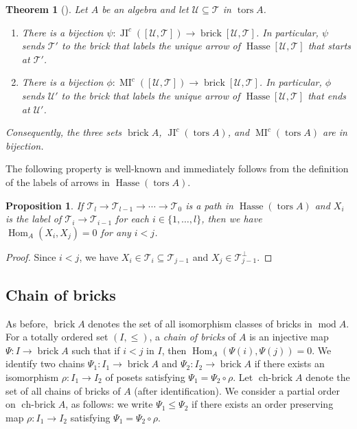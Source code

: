 \documentclass{amsart}
\theoremstyle{thmstyle}
\newtheorem{theorem}[thm]{Theorem}
\newtheorem{proposition}[thm]{Proposition}
\theoremstyle{exstyle}
\theoremstyle{defstyle}
\theoremstyle{remstyle}
\theoremstyle{remstyle}
\newcommand{\Hom}{\operatorname{Hom}}
\DeclareMathOperator*{\modu}{mod}
\DeclareMathOperator*{\brick}{brick}
\DeclareMathOperator*{\tors}{tors}
\DeclareMathOperator*{\chbrick}{ch-brick}
\DeclareMathOperator*{\JI}{JI}
\DeclareMathOperator*{\MI}{MI}
\DeclareMathOperator*{\Hasse}{Hasse}
\begin{document}
\begin{theorem}[{\cite[Theorem 3.4]{DI+}}]\label{Thm: bijection between Join-irr and brick-labels}
Let $A$ be an algebra and let $\mathcal{U} \subseteq \mathcal{T}$ in $\tors A$.
\begin{enumerate}
    \item There is a bijection $\psi: \JI^c([\mathcal{U},\mathcal{T}])\rightarrow \brick[\mathcal{U},\mathcal{T}]$. In particular, $\psi$ sends $\mathcal{T}'$ to the brick that labels the unique arrow of $\Hasse[\mathcal{U},\mathcal{T}]$ that starts at $\mathcal{T}'$.
    \item There is a bijection $\phi: \MI^c([\mathcal{U},\mathcal{T}])\rightarrow \brick[\mathcal{U},\mathcal{T}]$. In particular, $\phi$ sends $\mathcal{U}'$ to the brick that labels the unique arrow of $\Hasse[\mathcal{U},\mathcal{T}]$ that ends at $\mathcal{U}'$.
\end{enumerate}
Consequently, the three sets $\brick A$, $\JI^c(\tors A)$, and $\MI^c(\tors A)$ are in bijection.
\end{theorem}

The following property is well-known and immediately follows from the definition of the labels of arrows in $\Hasse(\tors A)$.

\begin{proposition}\label{Prop: labels distinct in a path}
If $\mathcal{T}_l \to \mathcal{T}_{l-1} \to \cdots \to \mathcal{T}_0$ is a path in $\Hasse(\tors A)$ and $X_i$ is the label of $\mathcal{T}_i \to \mathcal{T}_{i-1}$ for each $i \in \{1,\ldots,l\}$, then we have $\Hom_A(X_i,X_j)=0$ for any $i<j$.    
\end{proposition}

\begin{proof}
Since $i<j$, we have $X_i \in \mathcal{T}_i \subseteq \mathcal{T}_{j-1}$ and $X_j \in \mathcal{T}_{j-1}^\perp$.
\end{proof}

\subsection{Chain of bricks}\label{Subsection: Chain of bricks}
As before, $\brick A$ denotes the set of all isomorphism classes of bricks in $\modu A$. 
For a totally ordered set $(I,\leq)$, a \emph{chain of bricks} of $A$ is an injective map $\Psi: I \rightarrow \brick A$ such that if $i < j$ in $I$, then $\Hom_A(\Psi(i),\Psi(j))=0$. 
We identify two chains $\Psi_1:I_1\to\brick A$ and $\Psi_2:I_2\to\brick A$ if there exists an isomorphism $\rho:I_1\to I_2$ of posets satisfying $\Psi_1=\Psi_2\circ\rho$.
Let $\chbrick A$ denote the set of all chains of bricks of $A$ (after identification). We consider a partial order on $\chbrick A$, as follows: we write $\Psi_1\le\Psi_2$ if there exists an order preserving map $\rho:I_1\to I_2$ satisfying $\Psi_1=\Psi_2\circ\rho$.
\end{document}
